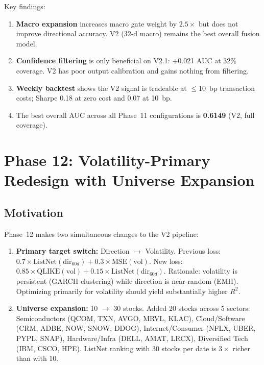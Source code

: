 \documentclass[12pt,a4paper]{article}
\begin{document}
Key findings:
\begin{enumerate}
    \item \textbf{Macro expansion} increases macro gate weight by $2.5\times$
          but does not improve directional accuracy. V2 (32-d macro)
          remains the best overall fusion model.
    \item \textbf{Confidence filtering} is only beneficial on V2.1:
          +0.021 AUC at 32\% coverage. V2 has poor output calibration
          and gains nothing from filtering.
    \item \textbf{Weekly backtest} shows the V2 signal is tradeable at
          $\leq$10~bp transaction costs; Sharpe 0.18 at zero cost
          and 0.07 at 10~bp.
    \item The best overall AUC across all Phase~11 configurations
          is \textbf{0.6149} (V2, full coverage).
\end{enumerate}

\newpage
\section{Phase 12: Volatility-Primary Redesign with Universe Expansion}

\subsection{Motivation}
Phase~12 makes two simultaneous changes to the V2 pipeline:

\begin{enumerate}
    \item \textbf{Primary target switch:} Direction $\to$ Volatility.
    Previous loss: $0.7\times\text{ListNet}(\text{dir}_{60d}) + 0.3\times\text{MSE}(\text{vol})$.
    New loss: $0.85\times\text{QLIKE}(\text{vol}) + 0.15\times\text{ListNet}(\text{dir}_{60d})$.
    Rationale: volatility is persistent (GARCH clustering) while
    direction is near-random (EMH). Optimizing primarily for volatility
    should yield substantially higher $R^2$.

    \item \textbf{Universe expansion:} 10 $\to$ 30 stocks.
    Added 20 stocks across 5 sectors: Semiconductors (QCOM, TXN, AVGO, MRVL, KLAC),
    Cloud/Software (CRM, ADBE, NOW, SNOW, DDOG),
    Internet/Consumer (NFLX, UBER, PYPL, SNAP),
    Hardware/Infra (DELL, AMAT, LRCX),
    Diversified Tech (IBM, CSCO, HPE).
    ListNet ranking with 30 stocks per date is $3\times$ richer than with 10.
\end{enumerate}
\end{document}
